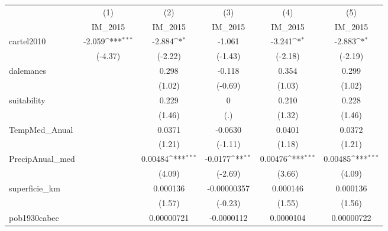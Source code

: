 {
\def\sym#1{\ifmmode^{#1}\else\(^{#1}\)\fi}
\begin{tabular}{l*{5}{c}}
\hline\hline
            &\multicolumn{1}{c}{(1)}&\multicolumn{1}{c}{(2)}&\multicolumn{1}{c}{(3)}&\multicolumn{1}{c}{(4)}&\multicolumn{1}{c}{(5)}\\
            &\multicolumn{1}{c}{IM\_2015}&\multicolumn{1}{c}{IM\_2015}&\multicolumn{1}{c}{IM\_2015}&\multicolumn{1}{c}{IM\_2015}&\multicolumn{1}{c}{IM\_2015}\\
\hline
cartel2010  &      -2.059\sym{***}&      -2.884\sym{*}  &      -1.061         &      -3.241\sym{*}  &      -2.883\sym{*}  \\
            &     (-4.37)         &     (-2.22)         &     (-1.43)         &     (-2.18)         &     (-2.19)         \\
[1em]
dalemanes   &                     &       0.298         &      -0.118         &       0.354         &       0.299         \\
            &                     &      (1.02)         &     (-0.69)         &      (1.03)         &      (1.02)         \\
[1em]
suitability &                     &       0.229         &           0         &       0.210         &       0.228         \\
            &                     &      (1.46)         &         (.)         &      (1.32)         &      (1.46)         \\
[1em]
TempMed\_Anual&                     &      0.0371         &     -0.0630         &      0.0401         &      0.0372         \\
            &                     &      (1.21)         &     (-1.11)         &      (1.18)         &      (1.21)         \\
[1em]
PrecipAnual\_med&                     &     0.00484\sym{***}&     -0.0177\sym{**} &     0.00476\sym{***}&     0.00485\sym{***}\\
            &                     &      (4.09)         &     (-2.69)         &      (3.66)         &      (4.09)         \\
[1em]
superficie\_km&                     &    0.000136         & -0.00000357         &    0.000146         &    0.000136         \\
            &                     &      (1.57)         &     (-0.23)         &      (1.55)         &      (1.56)         \\
[1em]
pob1930cabec&                     &  0.00000721         &  -0.0000112         &   0.0000104         &  0.00000722         \\

\end{tabular}}
